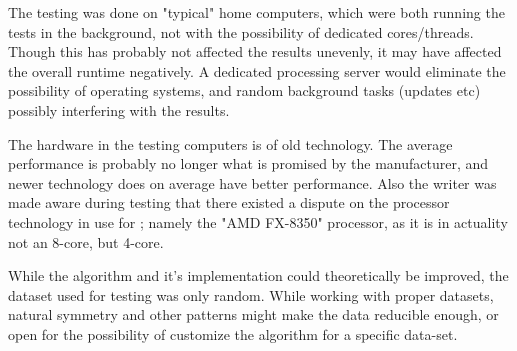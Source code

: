 \documentclass[a4paper]{article}
\begin{document}
The testing was done on "typical" home computers, which were both running the tests in the background, not
with the possibility of dedicated cores/threads. Though this has probably not affected the results unevenly,
it may have affected the overall runtime negatively. A dedicated processing server would eliminate the
possibility of operating systems, and random background tasks (updates etc) possibly
interfering with the results.

The hardware in the testing computers is of old technology. The average performance is probably no longer what
is promised by the manufacturer, and newer technology does on average have better performance. Also the writer
was made aware during testing that there existed a dispute on the processor technology in use for ;
namely the "AMD FX-8350" processor, as it is in actuality not an 8-core, but 4-core.
\cite{dickey_v._advanced_micro_devices:inc._2015,dickey_v._advanced_micro_devices:inc._2020,chaim_gartenberg_2019}

While the algorithm and it's implementation could theoretically be improved, the dataset used for testing was only
random. While working with proper datasets, natural symmetry and other patterns might make the data reducible enough,
or open for the possibility of customize the algorithm for a specific data-set.




%
%
\newpage

\end{document}
